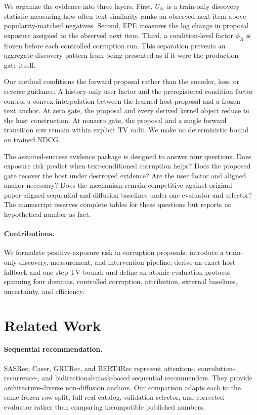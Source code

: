 \documentclass[letterpaper]{article}
\newcommand{\Uds}{U_{\mathrm{ds}}}
\begin{document}
We organize the evidence into three layers. First, $\Uds$ is a train-only discovery statistic measuring how often text similarity ranks an observed next item above popularity-matched negatives. Second, EPE measures the log change in proposal exposure assigned to the observed next item. Third, a condition-level factor $\phi_R$ is frozen before each controlled corruption run. This separation prevents an aggregate discovery pattern from being presented as if it were the production gate itself.

Our method conditions the forward proposal rather than the encoder, loss, or reverse guidance. A history-only user factor and the preregistered condition factor control a convex interpolation between the learned host proposal and a frozen text anchor. At zero gate, the proposal and every derived kernel object reduce to the host construction. At nonzero gate, the proposal and a single forward transition row remain within explicit TV radii. We make no deterministic bound on trained NDCG.

The assumed-success evidence package is designed to answer four questions. Does exposure risk predict when text-conditioned corruption helps? Does the proposed gate recover the host under destroyed evidence? Are the user factor and aligned anchor necessary? Does the mechanism remain competitive against original-paper-aligned sequential and diffusion baselines under one evaluator and selector? The manuscript reserves complete tables for these questions but reports no hypothetical number as fact.

\paragraph{Contributions.}
We formulate positive-exposure risk in corruption proposals; introduce a train-only discovery, measurement, and intervention pipeline; derive an exact host fallback and one-step TV bound; and define an atomic evaluation protocol spanning four domains, controlled corruption, attribution, external baselines, uncertainty, and efficiency.

\section{Related Work}
\paragraph{Sequential recommendation.}
SASRec, Caser, GRURec, and BERT4Rec represent attention-, convolution-, recurrence-, and bidirectional-mask-based sequential recommenders. They provide architecture-diverse non-diffusion anchors. Our comparison adapts each to the same frozen row split, full real catalog, validation selector, and corrected evaluator rather than comparing incompatible published numbers.
\end{document}
